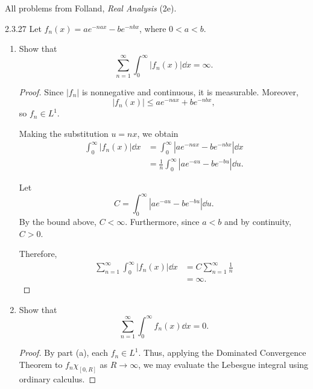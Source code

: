 \documentclass[11pt]{article}
\begin{document}
All problems from Folland, \textit{Real Analysis} (2e).

\begin{problem}{2.3.27}
  Let \( f_n(x) = ae^{-nax} - be^{-nbx} \), where \( 0 < a < b \).
  \begin{enumerate}[label=(\alph*)]
    \item Show that
      \begin{equation}
        \label{eq:p2327-a}
        \sum_{n=1}^{\infty}\int_0^\infty |f_n(x)|\dd{x} = \infty.
      \end{equation}
      \begin{proof}
        Since \( |f_n| \) is nonnegative and continuous, it is measurable.
        Moreover,
        \begin{equation}
          \label{eq:p2327-bound}
          |f_n(x)| \leq ae^{-nax} + be^{-nbx},
        \end{equation}
        so \( f_n \in L^1 \).

        Making the substitution \( u = nx \), we obtain
        \begin{equation}
          \label{eq:p2327-substitution}
          \begin{aligned}
            \int_0^\infty |f_n(x)|\dd{x}
            &= \int_0^\infty |ae^{-nax}-be^{-nbx}|\dd{x} \\
            &= \frac{1}{n}\int_0^\infty |ae^{-au}-be^{-bu}|\dd{u}.
          \end{aligned}
        \end{equation}

        Let
        \begin{equation}
          \label{eq:p2327-constant}
          C = \int_0^\infty |ae^{-au}-be^{-bu}|\dd{u}.
        \end{equation}
        By the bound above, \( C < \infty \).
        Furthermore, since \( a < b \) and by continuity, \( C > 0 \).

        Therefore,
        \begin{equation}
          \label{eq:p2327-divergence}
          \begin{aligned}
            \sum_{n=1}^\infty \int_0^\infty |f_n(x)|\dd{x}
            &= C\sum_{n=1}^\infty \frac{1}{n} \\
            &= \infty.
          \end{aligned}
        \end{equation}
      \end{proof}

    \item Show that
      \begin{equation}
        \label{eq:p2327-b}
        \sum_{n=1}^\infty\int_0^\infty f_n(x)\dd{x} = 0.
      \end{equation}
      \begin{proof}
        By part (a), each \( f_n \in L^1 \).
        Thus, applying the Dominated Convergence Theorem to
        \( f_n\chi_{[0,R]} \) as \( R \to \infty \), we may evaluate
        the Lebesgue integral using ordinary calculus.


\end{proof}
\end{enumerate}
\end{problem}
\end{document}
